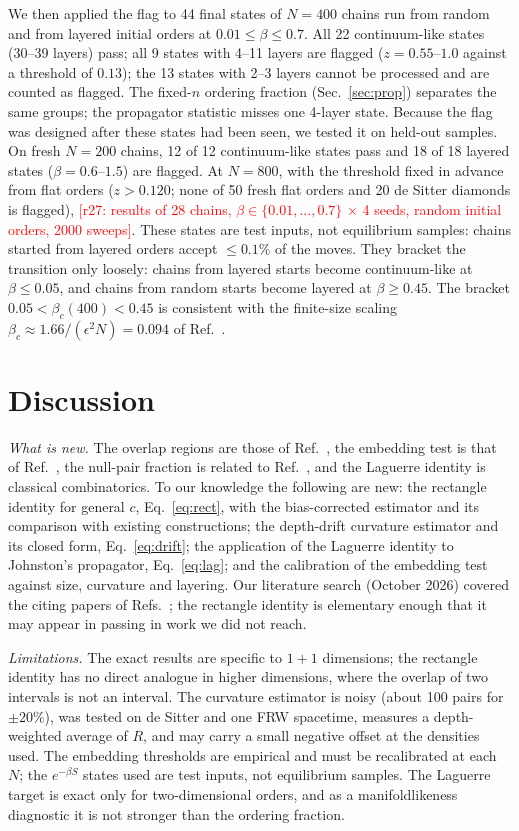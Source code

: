 \documentclass[prd,twocolumn,superscriptaddress,nofootinbib,amsmath,amssymb,floatfix]{revtex4-2}
\newcommand{\pending}[1]{\textcolor{red}{[#1]}}
\begin{document}
We then applied the flag to 44 final states of $N=400$ chains run from random and from layered initial orders at $0.01\leq\beta\leq0.7$. All 22 continuum-like states (30--39 layers) pass; all 9 states with 4--11 layers are flagged ($z=0.55$--$1.0$ against a threshold of $0.13$); the 13 states with 2--3 layers cannot be processed and are counted as flagged. The fixed-$n$ ordering fraction (Sec.~\ref{sec:prop}) separates the same groups; the propagator statistic misses one 4-layer state. Because the flag was designed after these states had been seen, we tested it on held-out samples. On fresh $N=200$ chains, 12 of 12 continuum-like states pass and 18 of 18 layered states ($\beta=0.6$--$1.5$) are flagged. At $N=800$, with the threshold fixed in advance from flat orders ($z>0.120$; none of 50 fresh flat orders and 20 de Sitter diamonds is flagged), \pending{r27: results of 28 chains, $\beta\in\{0.01,\dots,0.7\}$ $\times$ 4 seeds, random initial orders, 2000 sweeps}. These states are test inputs, not equilibrium samples: chains started from layered orders accept $\leq0.1\%$ of the moves. They bracket the transition only loosely: chains from layered starts become continuum-like at $\beta\leq0.05$, and chains from random starts become layered at $\beta\geq0.45$. The bracket $0.05<\beta_c(400)<0.45$ is consistent with the finite-size scaling $\beta_c\approx1.66/(\epsilon^2N)=0.094$ of Ref.~\cite{GOS18}.

\section{Discussion}\label{sec:disc}
\emph{What is new.} The overlap regions are those of Ref.~\cite{BK24}, the embedding test is that of Ref.~\cite{CloughEvans16}, the null-pair fraction is related to Ref.~\cite{GlaserSurya13}, and the Laguerre identity is classical combinatorics. To our knowledge the following are new: the rectangle identity for general $c$, Eq.~\eqref{eq:rect}, with the bias-corrected estimator and its comparison with existing constructions; the depth-drift curvature estimator and its closed form, Eq.~\eqref{eq:drift}; the application of the Laguerre identity to Johnston's propagator, Eq.~\eqref{eq:lag}; and the calibration of the embedding test against size, curvature and layering. Our literature search (October 2026) covered the citing papers of Refs.~\cite{BK24,CloughEvans16,Johnston08,Johnston09}; the rectangle identity is elementary enough that it may appear in passing in work we did not reach.

\emph{Limitations.} The exact results are specific to $1+1$ dimensions; the rectangle identity has no direct analogue in higher dimensions, where the overlap of two intervals is not an interval. The curvature estimator is noisy (about 100 pairs for $\pm20\%$), was tested on de Sitter and one FRW spacetime, measures a depth-weighted average of $R$, and may carry a small negative offset at the densities used. The embedding thresholds are empirical and must be recalibrated at each $N$; the $e^{-\beta S}$ states used are test inputs, not equilibrium samples. The Laguerre target is exact only for two-dimensional orders, and as a manifoldlikeness diagnostic it is not stronger than the ordering fraction.
\end{document}
